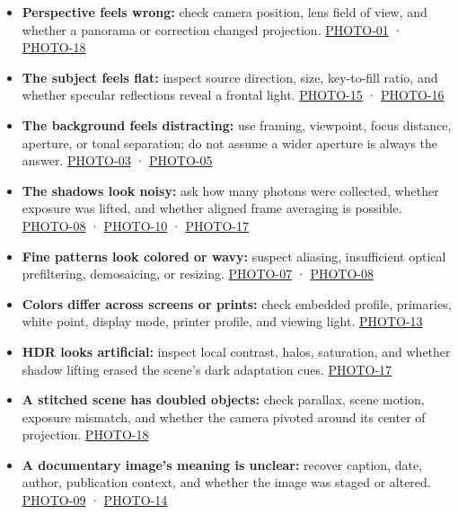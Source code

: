 \begin{itemize}
\tightlist
\item
  \textbf{Perspective feels wrong:} check camera position, lens field of view, and whether a panorama or correction changed projection. \hyperref[04-visual-computing-ii-ch036-photo-01---photography-session-01]{PHOTO-01} · \hyperref[04-visual-computing-ii-ch036-photo-18---photography-session-18]{PHOTO-18}
\item
  \textbf{The subject feels flat:} inspect source direction, size, key-to-fill ratio, and whether specular reflections reveal a frontal light. \hyperref[04-visual-computing-ii-ch036-photo-15---photography-session-15]{PHOTO-15} · \hyperref[04-visual-computing-ii-ch036-photo-16---photography-session-16]{PHOTO-16}
\item
  \textbf{The background feels distracting:} use framing, viewpoint, focus distance, aperture, or tonal separation; do not assume a wider aperture is always the answer. \hyperref[04-visual-computing-ii-ch036-photo-03---photography-session-03]{PHOTO-03} · \hyperref[04-visual-computing-ii-ch036-photo-05---photography-session-05]{PHOTO-05}
\item
  \textbf{The shadows look noisy:} ask how many photons were collected, whether exposure was lifted, and whether aligned frame averaging is possible. \hyperref[04-visual-computing-ii-ch036-photo-08---photography-session-08]{PHOTO-08} · \hyperref[04-visual-computing-ii-ch036-photo-10---photography-session-10]{PHOTO-10} · \hyperref[04-visual-computing-ii-ch036-photo-17---photography-session-17]{PHOTO-17}
\item
  \textbf{Fine patterns look colored or wavy:} suspect aliasing, insufficient optical prefiltering, demosaicing, or resizing. \hyperref[04-visual-computing-ii-ch036-photo-07---photography-session-07]{PHOTO-07} · \hyperref[04-visual-computing-ii-ch036-photo-08---photography-session-08]{PHOTO-08}
\item
  \textbf{Colors differ across screens or prints:} check embedded profile, primaries, white point, display mode, printer profile, and viewing light. \hyperref[04-visual-computing-ii-ch036-photo-13---photography-session-13]{PHOTO-13}
\item
  \textbf{HDR looks artificial:} inspect local contrast, halos, saturation, and whether shadow lifting erased the scene's dark adaptation cues. \hyperref[04-visual-computing-ii-ch036-photo-17---photography-session-17]{PHOTO-17}
\item
  \textbf{A stitched scene has doubled objects:} check parallax, scene motion, exposure mismatch, and whether the camera pivoted around its center of projection. \hyperref[04-visual-computing-ii-ch036-photo-18---photography-session-18]{PHOTO-18}
\item
  \textbf{A documentary image's meaning is unclear:} recover caption, date, author, publication context, and whether the image was staged or altered. \hyperref[04-visual-computing-ii-ch036-photo-09---photography-session-09]{PHOTO-09} · \hyperref[04-visual-computing-ii-ch036-photo-14---photography-session-14]{PHOTO-14}
\end{itemize}

